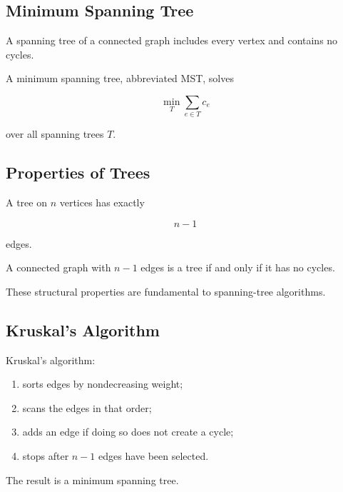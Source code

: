 \subsection{Minimum Spanning Tree}
\label{subsec:minimum-spanning-tree}

A spanning tree of a connected graph includes every vertex and contains
no cycles.

A minimum spanning tree, abbreviated MST, solves

\[
\boxed{
\min_{T}
\sum_{e\in T}
c_e
}
\]

over all spanning trees \(T\).

\subsection{Properties of Trees}
\label{subsec:tree-properties-combinatorial}

A tree on \(n\) vertices has exactly

\[
\boxed{
n-1
}
\]

edges.

A connected graph with \(n-1\) edges is a tree if and only if it has no
cycles.

These structural properties are fundamental to spanning-tree algorithms.

\subsection{Kruskal's Algorithm}
\label{subsec:kruskals-algorithm}

Kruskal's algorithm:

\begin{enumerate}
    \item sorts edges by nondecreasing weight;
    \item scans the edges in that order;
    \item adds an edge if doing so does not create a cycle;
    \item stops after \(n-1\) edges have been selected.
\end{enumerate}

The result is a minimum spanning tree.

